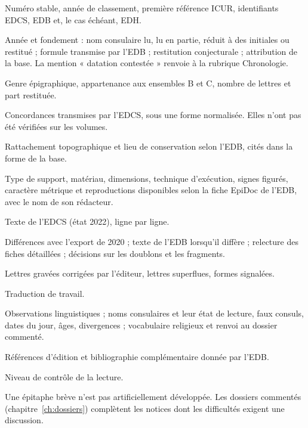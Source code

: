 \begin{description}[style=nextline,leftmargin=1.5em,font=\normalfont\scshape]
\item[En-tête] Numéro stable, année de classement, première référence ICUR, identifiants EDCS, EDB et, le cas échéant, EDH.
\item[Datation] Année et fondement : nom consulaire lu, lu en partie, réduit à des initiales ou restitué ; formule transmise par l’EDB ; restitution conjecturale ; attribution de la base. La mention « datation contestée » renvoie à la rubrique Chronologie.
\item[Genre] Genre épigraphique, appartenance aux ensembles B et C, nombre de lettres et part restituée.
\item[Références] Concordances transmises par l’EDCS, sous une forme normalisée. Elles n’ont pas été vérifiées sur les volumes.
\item[Provenance] Rattachement topographique et lieu de conservation selon l’EDB, cités dans la forme de la base.
\item[Support] Type de support, matériau, dimensions, technique d’exécution, signes figurés, caractère métrique et reproductions disponibles selon la fiche EpiDoc de l’EDB, avec le nom de son rédacteur.
\item[Texte] Texte de l’EDCS (état 2022), ligne par ligne.
\item[Témoins] Différences avec l’export de 2020 ; texte de l’EDB lorsqu’il diffère ; relecture des fiches détaillées ; décisions sur les doublons et les fragments.
\item[Apparat] Lettres gravées corrigées par l’éditeur, lettres superflues, formes signalées.
\item[Traduction] Traduction de travail.
\item[Langue, Chronologie, Commentaire] Observations linguistiques ; noms consulaires et leur état de lecture, faux consuls, dates du jour, âges, divergences ; vocabulaire religieux et renvoi au dossier commenté.
\item[Bibliographie] Références d’édition et bibliographie complémentaire donnée par l’EDB.
\item[Statut] Niveau de contrôle de la lecture.
\end{description}

Une épitaphe brève n’est pas artificiellement développée. Les dossiers commentés (chapitre~\ref{ch:dossiers}) complètent les notices dont les difficultés exigent une discussion.
